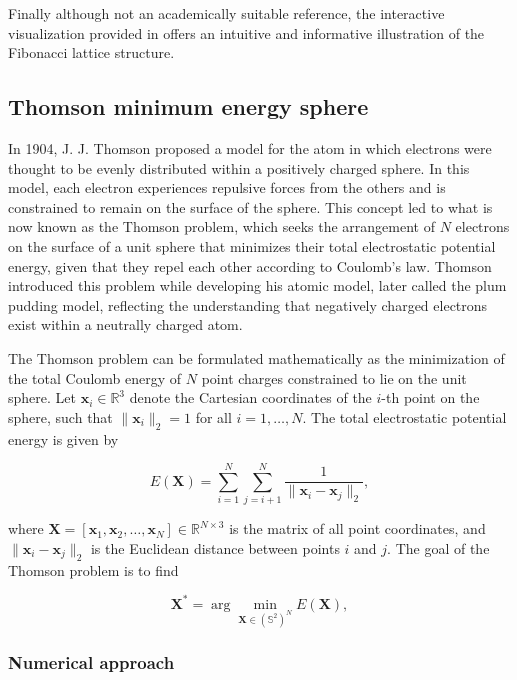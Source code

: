 Finally although not an academically suitable reference, the interactive visualization provided in \cite{fibonacci_lattice_internet} offers an intuitive and informative illustration of the Fibonacci lattice structure.

\subsection{Thomson minimum energy sphere} \label{sec.3:Thomson minimum energy sphere}

In 1904, J. J. Thomson proposed a model for the atom in which electrons were thought to be evenly distributed within a positively charged sphere. In this model, each electron experiences repulsive forces from the others and is constrained to remain on the surface of the sphere. This concept led to what is now known as the Thomson problem, which seeks the arrangement of $N$ electrons on the surface of a unit sphere that minimizes their total electrostatic potential energy, given that they repel each other according to Coulomb's law. Thomson introduced this problem while developing his atomic model, later called the plum pudding model, reflecting the understanding that negatively charged electrons exist within a neutrally charged atom.\cite{thomson_min_energy_sphere}

The Thomson problem can be formulated mathematically as the minimization of the total Coulomb energy of $N$ point charges constrained to lie on the unit sphere. Let $\mathbf{x}_i \in \mathbb{R}^3$ denote the Cartesian coordinates of the $i$-th point on the sphere, such that $\|\mathbf{x}_i\|_2 = 1$ for all $i = 1, \dots, N$. The total electrostatic potential energy is given by

\begin{equation}
E(\mathbf{X}) = \sum_{i=1}^{N} \sum_{j=i+1}^{N} \frac{1}{\|\mathbf{x}_i - \mathbf{x}_j\|_2},
\end{equation}

where $\mathbf{X} = [\mathbf{x}_1, \mathbf{x}_2, \dots, \mathbf{x}_N] \in \mathbb{R}^{N \times 3}$ is the matrix of all point coordinates, and $\|\mathbf{x}_i - \mathbf{x}_j\|_2$ is the Euclidean distance between points $i$ and $j$. The goal of the Thomson problem is to find

\begin{equation}
\mathbf{X}^* = \arg \min_{\mathbf{X} \in (\mathbb{S}^2)^N} E(\mathbf{X}),
\end{equation}

\subsubsection{Numerical approach}

